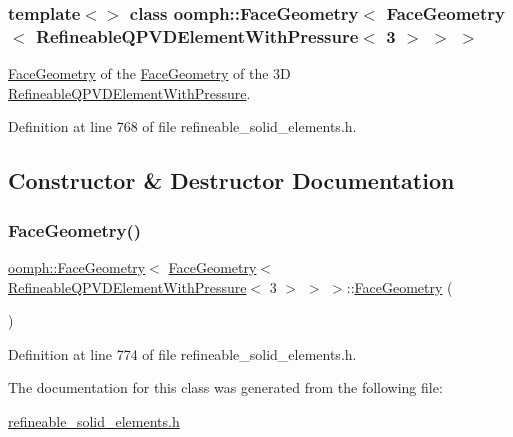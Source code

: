 \subsubsection*{template$<$$>$\newline
class oomph\+::\+Face\+Geometry$<$ Face\+Geometry$<$ Refineable\+Q\+P\+V\+D\+Element\+With\+Pressure$<$ 3 $>$ $>$ $>$}

\hyperlink{classoomph_1_1FaceGeometry}{Face\+Geometry} of the \hyperlink{classoomph_1_1FaceGeometry}{Face\+Geometry} of the 3D \hyperlink{classoomph_1_1RefineableQPVDElementWithPressure}{Refineable\+Q\+P\+V\+D\+Element\+With\+Pressure}. 

Definition at line 768 of file refineable\+\_\+solid\+\_\+elements.\+h.



\subsection{Constructor \& Destructor Documentation}
\mbox{\label{classoomph_1_1FaceGeometry_3_01FaceGeometry_3_01RefineableQPVDElementWithPressure_3_013_01_4_01_4_01_4_a8eb393e24d2d6006b0ce8b7a72a356f7}} 
\subsubsection{\texorpdfstring{Face\+Geometry()}{FaceGeometry()}}
{\footnotesize\ttfamily \hyperlink{classoomph_1_1FaceGeometry}{oomph\+::\+Face\+Geometry}$<$ \hyperlink{classoomph_1_1FaceGeometry}{Face\+Geometry}$<$ \hyperlink{classoomph_1_1RefineableQPVDElementWithPressure}{Refineable\+Q\+P\+V\+D\+Element\+With\+Pressure}$<$ 3 $>$ $>$ $>$\+::\hyperlink{classoomph_1_1FaceGeometry}{Face\+Geometry} (\begin{DoxyParamCaption}{ }\end{DoxyParamCaption})\hspace{0.3cm}{\ttfamily [inline]}}



Definition at line 774 of file refineable\+\_\+solid\+\_\+elements.\+h.



The documentation for this class was generated from the following file\+:\begin{DoxyCompactItemize}
\item 
\hyperlink{refineable__solid__elements_8h}{refineable\+\_\+solid\+\_\+elements.\+h}\end{DoxyCompactItemize}

